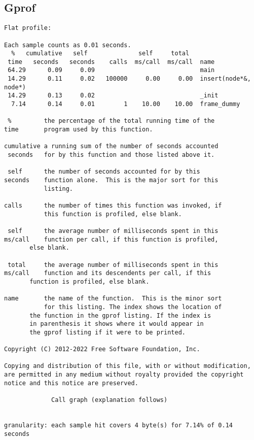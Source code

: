 \documentclass[pdf, unicode, 12pt, a4paper,oneside,fleqn]{article}
\begin{document}
\subsection*{Gprof}
\begin{lstlisting}
Flat profile:

Each sample counts as 0.01 seconds.
  %   cumulative   self              self     total           
 time   seconds   seconds    calls  ms/call  ms/call  name    
 64.29      0.09     0.09                             main
 14.29      0.11     0.02   100000     0.00     0.00  insert(node*&, node*)
 14.29      0.13     0.02                             _init
  7.14      0.14     0.01        1    10.00    10.00  frame_dummy

 %         the percentage of the total running time of the
time       program used by this function.

cumulative a running sum of the number of seconds accounted
 seconds   for by this function and those listed above it.

 self      the number of seconds accounted for by this
seconds    function alone.  This is the major sort for this
           listing.

calls      the number of times this function was invoked, if
           this function is profiled, else blank.

 self      the average number of milliseconds spent in this
ms/call    function per call, if this function is profiled,
	   else blank.

 total     the average number of milliseconds spent in this
ms/call    function and its descendents per call, if this
	   function is profiled, else blank.

name       the name of the function.  This is the minor sort
           for this listing. The index shows the location of
	   the function in the gprof listing. If the index is
	   in parenthesis it shows where it would appear in
	   the gprof listing if it were to be printed.

Copyright (C) 2012-2022 Free Software Foundation, Inc.

Copying and distribution of this file, with or without modification,
are permitted in any medium without royalty provided the copyright
notice and this notice are preserved.

		     Call graph (explanation follows)


granularity: each sample hit covers 4 byte(s) for 7.14% of 0.14 seconds


\end{lstlisting}
\end{document}
